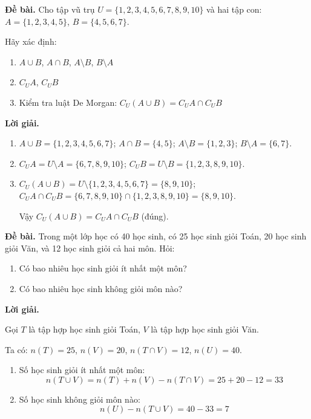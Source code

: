 \documentclass[12pt, a4paper]{report}
\begin{document}
\begin{vidu}[1]
  \textbf{Đề bài.} Cho tập vũ trụ \(U = \{1, 2, 3, 4, 5, 6, 7, 8, 9, 10\}\) và hai tập con:
  \(A = \{1, 2, 3, 4, 5\}\), \(B = \{4, 5, 6, 7\}\).

  Hãy xác định:
  \begin{enumerate}[label=\alph*)]
    \item \(A \cup B\), \(A \cap B\), \(A \setminus B\), \(B \setminus A\)
    \item \(C_U A\), \(C_U B\)
    \item Kiểm tra luật De Morgan: \(C_U(A \cup B) = C_U A \cap C_U B\)
  \end{enumerate}

  \medskip
  \textbf{Lời giải.}
  \begin{enumerate}[label=\alph*)]
    \item
    \(A \cup B = \{1, 2, 3, 4, 5, 6, 7\}\);
    \(A \cap B = \{4, 5\}\);
    \(A \setminus B = \{1, 2, 3\}\);
    \(B \setminus A = \{6, 7\}\).

    \item
    \(C_U A = U \setminus A = \{6, 7, 8, 9, 10\}\);
    \(C_U B = U \setminus B = \{1, 2, 3, 8, 9, 10\}\).

    \item
    \(C_U(A \cup B) = U \setminus \{1, 2, 3, 4, 5, 6, 7\} = \{8, 9, 10\}\);
    \(C_U A \cap C_U B = \{6, 7, 8, 9, 10\} \cap \{1, 2, 3, 8, 9, 10\} = \{8, 9, 10\}\).

    Vậy \(C_U(A \cup B) = C_U A \cap C_U B\) (đúng).
  \end{enumerate}
\end{vidu}

\begin{vidu}[2]
  \textbf{Đề bài.} Trong một lớp học có 40 học sinh, có 25 học sinh giỏi Toán, 20 học sinh giỏi Văn, và 12 học sinh giỏi cả hai môn. Hỏi:
  \begin{enumerate}[label=\alph*)]
    \item Có bao nhiêu học sinh giỏi ít nhất một môn?
    \item Có bao nhiêu học sinh không giỏi môn nào?
  \end{enumerate}

  \medskip
  \textbf{Lời giải.}

  Gọi \(T\) là tập hợp học sinh giỏi Toán, \(V\) là tập hợp học sinh giỏi Văn.

  Ta có: \(n(T) = 25\), \(n(V) = 20\), \(n(T \cap V) = 12\), \(n(U) = 40\).

  \begin{enumerate}[label=\alph*)]
    \item Số học sinh giỏi ít nhất một môn:
    \[
      n(T \cup V) = n(T) + n(V) - n(T \cap V) = 25 + 20 - 12 = 33
    \]
    \item Số học sinh không giỏi môn nào:
    \[
      n(U) - n(T \cup V) = 40 - 33 = 7
    \]
  \end{enumerate}
\end{vidu}
\end{document}
